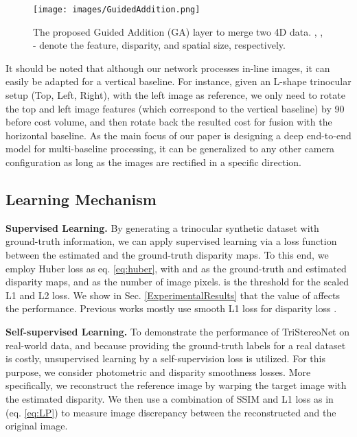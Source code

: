 \documentclass[10pt,twocolumn,letterpaper]{article}
\begin{document}
\begin{figure}[t]
	\begin{center}
		\texttt{[image: images/GuidedAddition.png]}
	\end{center}
	\vspace{-0.7cm}
	\caption{The proposed Guided Addition (GA) layer to merge two 4D data. , , - denote the feature, disparity, and spatial size, respectively.}
	\label{fig:ga}
\end{figure} 
It should be noted that although our network processes in-line images, it can easily be adapted for a vertical baseline. For instance, given an L-shape trinocular setup (Top, Left, Right), with the left image as reference, we only need to rotate the top and left image features (which correspond to the vertical baseline) by 90 before cost volume, and then rotate back the resulted cost for fusion with the horizontal baseline. As the main focus of our paper is designing a deep end-to-end model for multi-baseline processing, it can be generalized to any other camera configuration as long as the images are rectified in a specific direction.
\vspace{-0.1cm}
\subsection{Learning Mechanism}
\noindent\textbf{Supervised Learning.} By generating a trinocular synthetic dataset with ground-truth information, we can apply supervised learning via a loss function between the estimated and the ground-truth disparity maps. To this end, we employ Huber loss as eq. \ref{eq:huber}, with  and  as the ground-truth and estimated disparity maps, and  as the number of image pixels.  is the threshold for the scaled L1 and L2 loss. We show in Sec. \ref{ExperimentalResults} that the value of  affects the performance. Previous works mostly use smooth L1 loss for disparity loss \cite{chang2018pyramid,guo2019group,zhang2019ga,duggal2019deeppruner,shen2021cfnet}.

\noindent\textbf{Self-supervised Learning.} To demonstrate the performance of TriStereoNet on real-world data, and because providing the ground-truth labels for a real dataset is costly, unsupervised learning by a self-supervision loss is utilized. For this purpose, we consider photometric and disparity smoothness losses. More specifically, we reconstruct the reference image by warping the target image with the estimated disparity. We then use a combination of SSIM \cite{wang2004image} and L1 loss as in \cite{godard2017unsupervised} (eq. \ref{eq:LP}) to measure image discrepancy between the reconstructed and the original image.
\end{document}
